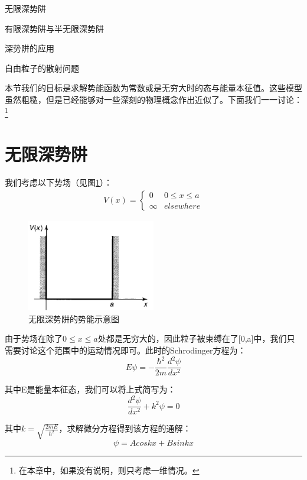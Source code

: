 \begin{introduction}
    \item 无限深势阱
    \item 有限深势阱与半无限深势阱
    \item 深势阱的应用
    \item 自由粒子的散射问题
\end{introduction}
本节我们的目标是求解势能函数为常数或是无穷大时的态与能量本征值。这些模型虽然粗糙，但是已经能够对一些深刻的物理概念作出近似了。下面我们一一讨论：
\footnote{在本章中，如果没有说明，则只考虑一维情况。}
\section{无限深势阱}
我们考虑以下势场（见图\ref{fig3:inftypotential}）：
\begin{align}
V(x)=\left\{
    \begin{array}{ll}
       0  &  0\leq x\leq a\\
       \infty  & elsewhere 
    \end{array}
\right.
\end{align}

\begin{figure}[htp]
    \centering
    \includegraphics[width=0.5\textwidth]{figure/inftypotential.jpg}
    \caption{无限深势阱的势能示意图}
    \label{fig3:inftypotential}
\end{figure}

由于势场在除了$0\leq x\leq a$处都是无穷大的，因此粒子被束缚在了[0,a]中，我们只需要讨论这个范围中的运动情况即可。此时的Schrodinger方程为：
\begin{equation}
    E\psi =-\frac{\hbar^2}{2m}\frac{d^2\psi}{dx^2}
\end{equation}

其中E是能量本征态，我们可以将上式简写为：
\begin{equation}\label{equ3:string}
\frac{d^2\psi}{dx^2}+k^2\psi =0    
\end{equation}

其中$k=\sqrt{\frac{2mE}{\hbar^2}}$，求解微分方程得到该方程的通解：
\begin{equation}
    \psi =Acoskx+Bsinkx
\end{equation}


